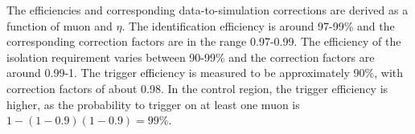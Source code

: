 The efficiencies and corresponding data-to-simulation corrections are derived 
as a function of muon \pt and $\eta$. The identification efficiency is around 
97-99\% and the corresponding correction factors are in the range 0.97-0.99. 
The efficiency 
of the isolation requirement varies between 90-99\% and the correction factors 
are around 0.99-1. The trigger efficiency is measured to be approximately 90\%, 
with correction factors of about 0.98. 
In the \mmj control region, the trigger efficiency is higher, as the 
probability to trigger on at least one muon is $1-(1-0.9)(1-0.9) = 
99\%$.

